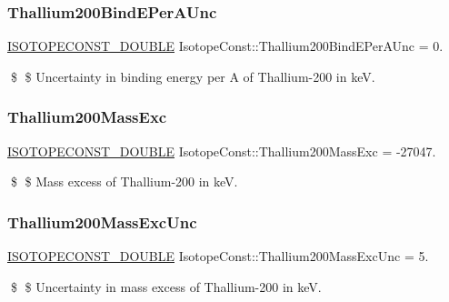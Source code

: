 \subsubsection{\texorpdfstring{Thallium200\+Bind\+E\+Per\+A\+Unc}{Thallium200BindEPerAUnc}}
{\footnotesize\ttfamily \mbox{\hyperlink{group___isotope_const-_macros_ga8f45a7272ce02c0b4c65c44636ed719a}{I\+S\+O\+T\+O\+P\+E\+C\+O\+N\+S\+T\+\_\+\+D\+O\+U\+B\+LE}} Isotope\+Const\+::\+Thallium200\+Bind\+E\+Per\+A\+Unc = 0.}

\$ \$ Uncertainty in binding energy per A of Thallium-\/200 in keV. \mbox{\label{group___isotope_const-_thallium-_tl200_ga1dcd3422c3b058d487acda3015f347a6}} 
\subsubsection{\texorpdfstring{Thallium200\+Mass\+Exc}{Thallium200MassExc}}
{\footnotesize\ttfamily \mbox{\hyperlink{group___isotope_const-_macros_ga8f45a7272ce02c0b4c65c44636ed719a}{I\+S\+O\+T\+O\+P\+E\+C\+O\+N\+S\+T\+\_\+\+D\+O\+U\+B\+LE}} Isotope\+Const\+::\+Thallium200\+Mass\+Exc = -\/27047.}

\$ \$ Mass excess of Thallium-\/200 in keV. \mbox{\label{group___isotope_const-_thallium-_tl200_ga2e5fd0caaaae7742735bd1265944d6ec}} 
\subsubsection{\texorpdfstring{Thallium200\+Mass\+Exc\+Unc}{Thallium200MassExcUnc}}
{\footnotesize\ttfamily \mbox{\hyperlink{group___isotope_const-_macros_ga8f45a7272ce02c0b4c65c44636ed719a}{I\+S\+O\+T\+O\+P\+E\+C\+O\+N\+S\+T\+\_\+\+D\+O\+U\+B\+LE}} Isotope\+Const\+::\+Thallium200\+Mass\+Exc\+Unc = 5.}

\$ \$ Uncertainty in mass excess of Thallium-\/200 in keV. \mbox{\label{group___isotope_const-_thallium-_tl200_ga57ab99a283de474c1144613aafe82d11}} 
